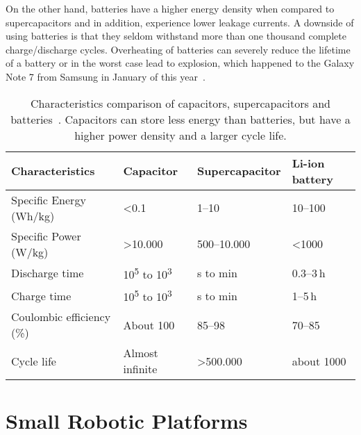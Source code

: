 On the other hand, batteries have a higher energy density when compared to supercapacitors and in addition, experience lower leakage currents.
A downside of using batteries is that they seldom withstand more than one thousand complete charge/discharge cycles.
Overheating of batteries can severely reduce the lifetime of a battery or in the worst case lead to explosion, which happened to the Galaxy Note 7 from Samsung in January of this year~\cite{samsung_note7_2017}.



\begin{table}[t]
	\centering
	\caption{Characteristics comparison of capacitors, supercapacitors and batteries~\cite{Gonzalez_rser_2016}. Capacitors can store less energy than batteries, but have a higher power density and a larger cycle life.}
	\label{tab:cap_scap_battery}
	\small
	\begin{tabular}{|l||l|l|l|}
		\hline
		Characteristics & Capacitor & Supercapacitor & Li-ion battery \\
		\hline \hline
		Specific Energy (Wh/kg) & \textless 0.1 & 1--10 & 10--100 \\
		Specific Power (W/kg) & \textgreater 10.000 & 500--10.000 & \textless 1000 \\
		Discharge time & 10\textsuperscript{5} to 10\textsuperscript{3} & s to min & 0.3--3\,h \\
		Charge time & 10\textsuperscript{5} to 10\textsuperscript{3} & s to min & 1--5\,h \\
		Coulombic efficiency (\%) & About 100 & 85--98 & 70--85 \\
		Cycle life & Almost infinite & \textgreater 500.000 & about 1000 \\
		\hline
	\end{tabular}
\end{table}


\section{Small Robotic Platforms}
\label{sec:rw_robotic_platforms}

